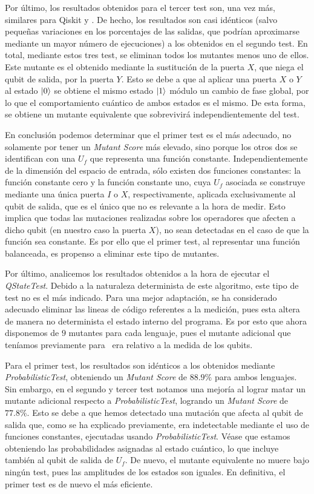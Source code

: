 Por último, los resultados obtenidos  para el tercer test son, una vez más, similares  para Qiskit y \qsh. De hecho, los resultados son casi idénticos (salvo pequeñas variaciones en los porcentajes de las salidas, que podrían aproximarse mediante un mayor número de ejecuciones) a los obtenidos en el segundo test. En total, mediante estos tres test, se eliminan todos los mutantes menos uno de ellos. Este mutante es el obtenido mediante la sustitución de la puerta $X$, que niega el qubit de salida, por la puerta $Y$. Esto se debe a que al aplicar una puerta $X$ o $Y$ al estado $\left|0\right\rangle$ se obtiene el mismo estado $\left|1\right\rangle$ módulo un cambio de fase global, por lo que el comportamiento cuántico de ambos estados es el mismo. De esta forma, se obtiene un mutante equivalente que sobrevivirá independientemente del test. 

En conclusión podemos determinar que el primer test es el más adecuado, no solamente por tener un \textit{Mutant Score} más elevado, sino porque los otros dos se identifican con una $U_f$ que representa una función constante. Independientemente de la dimensión del espacio de entrada, sólo existen dos funciones constantes: la función constante cero y la función constante uno, cuya $U_f$ asociada se construye mediante una única puerta $I$ o $X$, respectivamente, aplicada exclusivamente al qubit de salida, que es el único que no es relevante a la hora de medir. Esto implica que todas las mutaciones realizadas sobre los operadores que afecten a dicho qubit (en nuestro caso la puerta $X$), no sean detectadas en el caso de que la función sea constante. Es por ello que el primer test, al representar una función balanceada, es propenso a eliminar este tipo de mutantes.

Por último, analicemos los resultados obtenidos a la hora de ejecutar el \textit{QStateTest}. Debido a la naturaleza determinista de este algoritmo, este tipo de test no es el más indicado. Para una mejor adaptación, se ha considerado adecuado eliminar las lineas de código referentes a la medición, pues esta altera de manera no determinista el estado interno del programa. Es por esto que ahora disponemos de $9$ mutantes para cada lenguaje, pues el mutante adicional que teníamos previamente para \qsh\ era relativo a la medida de los qubits.

Para el primer test, los resultados son idénticos a los obtenidos mediante \textit{ProbabilisticTest}, obteniendo un \textit{Mutant Score} de $88.9\%$ para ambos lenguajes. Sin embargo, en el segundo y tercer test notamos una mejoría al lograr matar un mutante adicional respecto a \textit{ProbabilisticTest}, logrando un \textit{Mutant Score} de $77.8\%$. Esto se debe a que hemos detectado una mutación que afecta al qubit de salida que, como se ha explicado previamente, era indetectable mediante el uso de funciones constantes, ejecutadas usando \textit{ProbabilisticTest}. Véase que estamos obteniendo las probabilidades asignadas al estado cuántico, lo que incluye también al qubit de salida de $U_f$. De nuevo, el mutante equivalente no muere bajo ningún test, pues las amplitudes de los estados son iguales. En definitiva, el primer test es de nuevo el más eficiente.